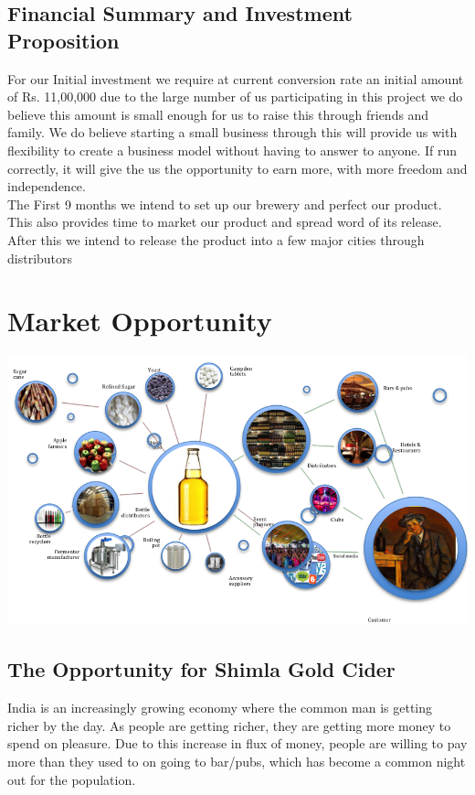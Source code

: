 \documentclass[11pt]{article}
\begin{document}
  \subsection{Financial Summary and Investment Proposition}
     For our Initial investment we require at current conversion rate an initial amount of Rs. 11,00,000 due to the large number of us participating in this project we do believe this amount is small enough for us to raise this through friends and family. We do believe starting a small business through this will provide us with flexibility to create a business model without having to answer to anyone. If run correctly, it will give the us the opportunity to earn more, with more freedom and independence.\\
     The First 9 months we intend to set up our brewery and perfect our product. This also provides time to market our product and spread word of its release. After this we intend to release the product into a few major cities through distributors

\newpage
\section{Market Opportunity}
  \includegraphics[angle=90,width=\textwidth,height=\textheight,keepaspectratio]{./supplychain.png}
  \subsection{The Opportunity for Shimla Gold Cider}

India is an increasingly growing economy where the common man is getting richer by the day. As people are getting richer, they are getting more money to spend on pleasure. Due to this increase in flux of money, people are willing to pay more than they used to on going to bar/pubs, which has become a common night out for the population. \\
\end{document}
